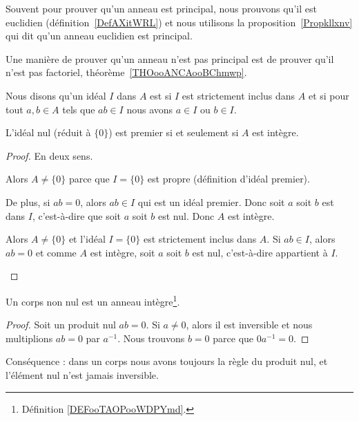 Souvent pour prouver qu'un anneau est principal, nous prouvons qu'il est euclidien (définition~\ref{DefAXitWRL}) et nous utilisons la proposition~\ref{Propkllxnv} qui dit qu'un anneau euclidien est principal.

Une manière de prouver qu'un anneau n'est pas principal est de prouver qu'il n'est pas factoriel, théorème~\ref{THOooANCAooBChmwp}.

\begin{definition}      \label{DEFooAQSZooVhvQWv}
	Nous disons qu'un idéal \( I\) dans \( A\) est  si \( I\) est strictement inclus dans \( A\) et si pour tout \( a,b\in A\) tels que \( ab\in I\) nous avons \( a\in I\) ou \( b\in I\).
\end{definition}

\begin{lemma}       \label{LEMooYRPBooYxXXsi}
	L'idéal nul (réduit à \( \{ 0 \}\)) est premier si et seulement si \( A\) est intègre.
\end{lemma}

\begin{proof}
	En deux sens.
	\begin{subproof}
		Alors \( A\neq \{ 0 \}\) parce que \( I=\{ 0 \}\) est propre (définition d'idéal premier).

		De plus, si \( ab=0\), alors \( ab\in I\) qui est un idéal premier. Donc soit \( a\) soit \( b\) est dans \( I\), c'est-à-dire que soit \( a\) soit \( b\) est nul. Donc \( A\) est intègre.

		Alors \( A\neq \{ 0 \}\) et l'idéal \( I=\{ 0 \}\) est strictement inclus dans \( A\). Si \( ab\in I\), alors \( ab=0\) et comme \( A\) est intègre, soit \( a\) soit \( b\) est nul, c'est-à-dire appartient à \( I\).
	\end{subproof}
\end{proof}


\begin{lemma}       \label{LemAnnCorpsnonInterdivzer}
	Un corps non nul est un anneau intègre\footnote{Définition \ref{DEFooTAOPooWDPYmd}.}.
\end{lemma}

\begin{proof}
	Soit un produit nul \( ab=0\). Si \( a\neq 0\), alors il est inversible et nous multiplions \( ab=0\) par \( a^{-1}\). Nous trouvons \( b=0\) parce que \( 0a^{-1}=0\).
\end{proof}
Conséquence : dans un corps nous avons toujours la règle du produit nul, et l'élément nul n'est jamais inversible.

